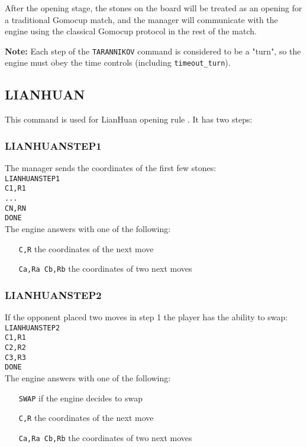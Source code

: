 \documentclass[12pt,a4paper]{article}
\begin{document}
After the opening stage, the stones on the board will be treated as an opening for a traditional Gomocup match, and the manager will communicate with the engine using the classical Gomocup protocol in the rest of the match.

\textbf{Note:} Each step of the \texttt{TARANNIKOV} command is considered to be a "turn", so the engine must obey the time controls (including \texttt{timeout{\_}turn}).


\subsection{LIANHUAN}
\label{cmd_lianhuan}
This command is used for LianHuan opening rule \cite{renju_opening_rules}. It has two steps:

\subsubsection{LIANHUANSTEP1}
The manager sends the coordinates of the first few stones:\\
\texttt{LIANHUANSTEP1}\\
\texttt{C1,R1}\\
\texttt{...}\\
\texttt{CN,RN}\\
\texttt{DONE}\\
The engine answers with one of the following:
\begin{enumerate}[leftmargin=7.5em]
\item[\texttt{C,R}]{the coordinates of the next move}
\item[\texttt{Ca,Ra Cb,Rb}]{the coordinates of two next moves}
\end{enumerate}

\subsubsection{LIANHUANSTEP2}
If the opponent placed two moves in step 1 the player has the ability to swap:\\
\texttt{LIANHUANSTEP2}\\
\texttt{C1,R1}\\
\texttt{C2,R2}\\
\texttt{C3,R3}\\
\texttt{DONE}\\
The engine answers with one of the following:
\begin{enumerate}[leftmargin=7.5em]
\item[\texttt{SWAP}]{if the engine decides to swap}
\item[\texttt{C,R}]{the coordinates of the next move}
\item[\texttt{Ca,Ra Cb,Rb}]{the coordinates of two next moves}
\end{enumerate}
\end{document}
